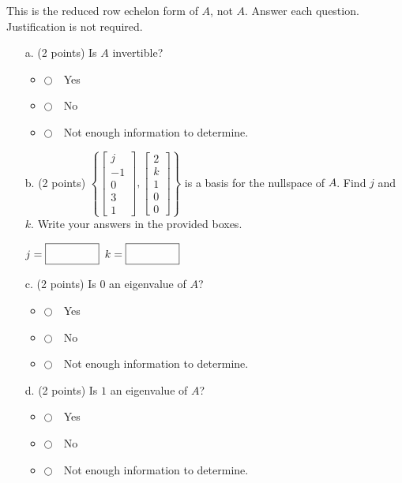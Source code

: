 \documentclass[12pt]{extarticle}
\newcommand{\chooseone}{{\Large$\Circle$\ \ }}
\begin{document}
\begin{enumerate}
This is the reduced row echelon form of $A$, not $A$. Answer each question. Justification is not required.

\begin{itemize}
    \item[a.] (2 points) Is $A$ invertible?
    \begin{itemize}[label={}]
\item \chooseone Yes
\item \chooseone No
\item \chooseone Not enough information to determine.
\end{itemize}

\vspace{0.2in}

\item[b.] (2 points) $\left\{\begin{bmatrix}j\\ -1\\0\\3\\1\end{bmatrix},\begin{bmatrix} 2 \\ k\\ 1 \\ 0 \\0\end{bmatrix}\right\}$ is a basis for the nullspace of $A$. Find $j$ and $k$. Write your answers in the provided boxes.

\bigskip

$j=\boxed{\Large\phantom{Mqqqq}}$  \qquad \qquad $k=\boxed{\Large\phantom{Mqqqq}}$ 


\vspace{0.2in}

\item[c.] (2 points)  Is $0$ an eigenvalue of $A$?
\begin{itemize}[label={}]
\item \chooseone Yes
\item \chooseone No
\item \chooseone Not enough information to determine.
\end{itemize}


\vspace{0.2in}

\item[d.] (2 points)  Is $1$ an eigenvalue of $A$?
\begin{itemize}[label={}]
\item \chooseone Yes
\item \chooseone No
\item \chooseone Not enough information to determine.
\end{itemize}



\end{itemize}
\end{enumerate}
\end{document}
